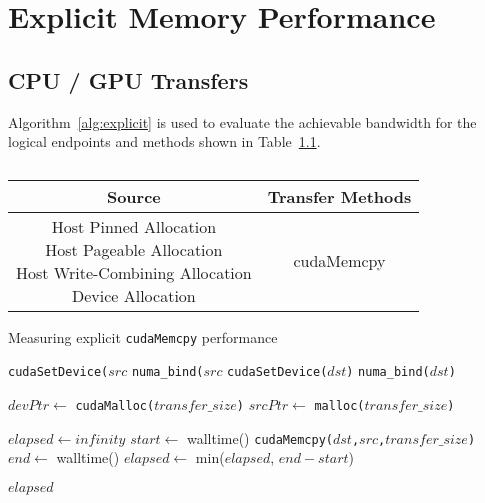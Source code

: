 \chapter{Explicit Memory Performance}
\label{ch:explicit}

\section{CPU / GPU Transfers}

Algorithm~\ref{alg:explicit} is used to evaluate the achievable bandwidth for the logical endpoints and methods shown in Table~\ref{tab:explicit}.

\begin{table}[ht]
    \centering
    \caption[]{}
    \label{tab:explicit}
    \begin{tabular}{|c|c|}
    \hline
    \textbf{Source} & \textbf{Transfer Methods} \\ \hline 
    \makecell{Host Pinned Allocation \\ Host Pageable Allocation \\ Host Write-Combining Allocation \\ Device Allocation} & cudaMemcpy \\ \hline
    \end{tabular}
\end{table}

\begin{algorithm}
    \caption{Measuring explicit \texttt{cudaMemcpy} performance}
    \label{alg:explicit}
    \begin{algorithmic}[1]
    \Statex
            \State \texttt{cudaSetDevice($src$}
        \Else {}
            \State \texttt{numa\_bind($src$}
        \EndIf
        \State \texttt{cudaSetDevice($dst$)}
        \Else {}
        \State \texttt{numa\_bind($dst$)}
        \EndIf

        \State $devPtr \gets$ \texttt{cudaMalloc($transfer\_size$)} 
        \State $srcPtr \gets$ \texttt{malloc($transfer\_size$)} 

        \State $elapsed \gets infinity$ 
            \State $start \gets$ walltime()
            \State \texttt{cudaMemcpy($dst$,$src$,$transfer\_size$)}
            \State $end \gets$ walltime()
            \State $elapsed \gets$ min($elapsed$, $end-start$)
        \EndFor

        \Return $elapsed$
    \EndFunction


    \end{algorithmic}
\end{algorithm}

